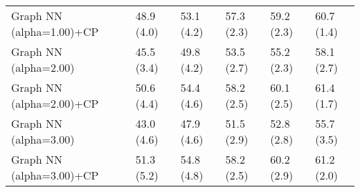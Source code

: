\documentclass{article}
\begin{document}
\begin{table*}[t!]
\begin{center}
\begin{small}
\begin{sc}
\begin{tabular}{llllll}
Graph NN (alpha=1.00)+CP&48.9 (4.0)      &53.1 (4.2)      &57.3 (2.3)      &59.2 (2.3)      &60.7 (1.4)      \\
Graph NN (alpha=2.00)&45.5 (3.4)      &49.8 (4.2)      &53.5 (2.7)      &55.2 (2.3)      &58.1 (2.7)      \\
Graph NN (alpha=2.00)+CP&50.6 (4.4)      &54.4 (4.6)      &58.2 (2.5)      &60.1 (2.5)      &61.4 (1.7)      \\
Graph NN (alpha=3.00)&43.0 (4.6)      &47.9 (4.6)      &51.5 (2.9)      &52.8 (2.8)      &55.7 (3.5)      \\
Graph NN (alpha=3.00)+CP&51.3 (5.2)      &54.8 (4.8)      &58.2 (2.5)      &60.2 (2.9)      &61.2 (2.0)      \\
\bottomrule
\end{tabular}
\end{sc}
\end{small}
\end{center}
\vskip -0.1in
\end{table*}
\end{document}

